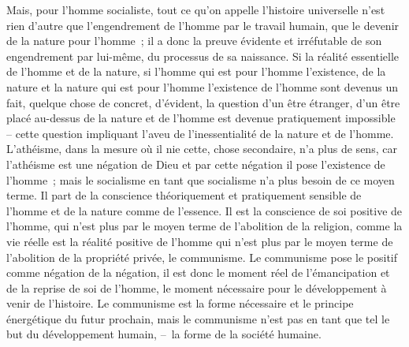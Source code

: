 \documentclass[french,twoside]{book} %
\begin{document}
Mais, pour l’homme socialiste, tout ce qu’on appelle l’histoire universelle n’est rien d’autre que l’engendrement de l’homme par le travail humain, que le devenir de la nature pour l’homme ; il a donc la preuve évidente et irréfutable de son engendrement par lui-même, du processus de sa naissance. Si la réalité essentielle de l’homme et de la nature, si l’homme qui est pour l’homme l’existence, de la nature et la nature qui est pour l’homme l’existence de l’homme sont devenus un fait, quelque chose de concret, d’évident, la question d’un être étranger, d’un être placé au-dessus de la nature et de l’homme est devenue pratiquement impossible – cette question impliquant l’aveu de l’inessentialité de la nature et de l’homme. L’athéisme, dans la mesure où il nie cette, chose secondaire, n’a plus de sens, car l’athéisme est une négation de Dieu et par cette négation il pose l’existence de l’homme ; mais le socialisme en tant que socialisme n’a plus besoin de ce moyen terme. Il part de la conscience théoriquement et pratiquement sensible de l’homme et de la nature comme de l’essence. Il est la conscience de soi positive de l’homme, qui n’est plus par le moyen terme de l’abolition de la religion, comme la vie réelle est la réalité positive de l’homme qui n’est plus par le moyen terme de l’abolition de la propriété privée, le communisme. Le communisme pose le positif comme négation de la négation, il est donc le moment réel de l’émancipation et de la reprise de soi de l’homme, le moment nécessaire pour le développement à venir de l’histoire. Le communisme est la forme nécessaire et le principe énergétique du futur prochain, mais le communisme n’est pas en tant que tel le but du développement humain, – la forme de la société humaine.
\end{document}
